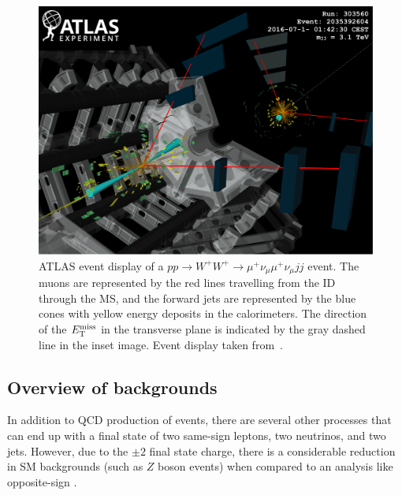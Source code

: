 \begin{figure}[htbp]
  \centering
  \includegraphics[width=.95\textwidth]{figs/ssww_13tev/introduction/evtdisplay_mm}
  \caption[ATLAS event display of a $pp\rightarrow W^{+}W^{+}\rightarrow\mu^{+}\nu_\mu\mu^{+}\nu_\mu jj$ event.  The muons are represented by the red lines travelling from the ID through the MS, and the forward jets are represented by the blue cones with yellow energy deposits in the calorimeters.  The direction of the $\met$ in the transverse plane is indicated by the gray dashed line in the inset image.]{ATLAS event display of a $pp\rightarrow W^{+}W^{+}\rightarrow\mu^{+}\nu_\mu\mu^{+}\nu_\mu jj$ event.  The muons are represented by the red lines travelling from the ID through the MS, and the forward jets are represented by the blue cones with yellow energy deposits in the calorimeters.  The direction of the $\met$ in the transverse plane is indicated by the gray dashed line in the inset image.  Event display taken from~\cite{2018.ssww-13tev-atlas-conf}.}
  \label{fig:ssww13tev_event_display_mm}
\end{figure}

\subsection{Overview of backgrounds}\label{ssww13tev:background_overview}
In addition to QCD production of \ssww events, there are several other processes that can end up with a final state of two same-sign leptons, two neutrinos, and two jets.
However, due to the $\pm 2$ final state charge, there is a considerable reduction in SM backgrounds (such as $Z$ boson events) when compared to an analysis like opposite-sign \oswwjj.

